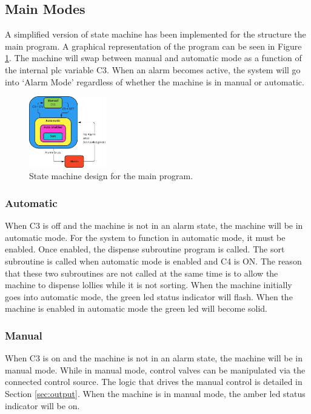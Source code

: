     \subsection{Main Modes}
    A simplified version of state machine has been implemented for the structure the main program. A graphical representation of the program can be seen in Figure \ref{fig:mainStateMachine}. The machine will swap between manual and automatic mode as a function of the internal \acrshort{plc} variable C3. When an alarm becomes active, the system will go into `Alarm Mode' regardless of whether the machine is in manual or automatic. 
    
        \begin{figure}[H]
            \centering
            \includegraphics[width = 0.3\textwidth]{2_images/mainStateMachine}
            \caption{State machine design for the main program.}
            \label{fig:mainStateMachine}
        \end{figure}
    
        \subsubsection{Automatic}
            When C3 is off and the machine is not in an alarm state, the machine will be in automatic mode. For the system to function in automatic mode, it must be enabled.  Once enabled, the dispense subroutine program is called. The sort subroutine is called when automatic mode is enabled and C4 is ON. The reason that these two subroutines are not called at the same time is to allow the machine to dispense lollies while it is not sorting. 
            When the machine initially goes into automatic mode, the green \acrshort{led} status indicator will flash. When the machine is enabled in automatic mode the green \acrshort{led} will become solid.

        \subsubsection{Manual}
            When C3 is on and the machine is not in an alarm state, the machine will be in manual mode. While in manual mode, control valves can be manipulated via the connected control source. The logic that drives the manual control is detailed in Section \ref{sec:output}.
            When the machine is in manual mode, the amber \acrshort{led} status indicator will be on. 

